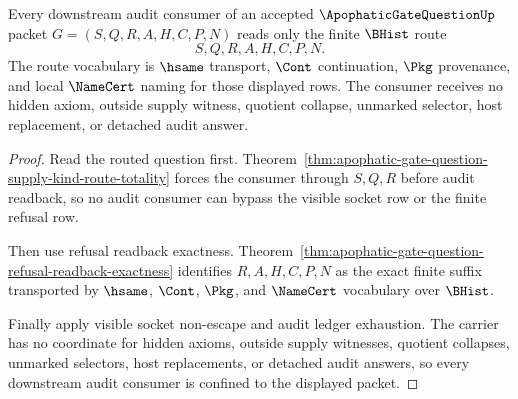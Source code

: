 \begin{theorem}
\label{thm:apophatic-gate-question-audit-consumer-nonescape}
Every downstream audit consumer of an accepted $\ApophaticGateQuestionUp$ packet $G=(S,Q,R,A,H,C,P,N)$ reads only the finite $\BHist$ route
$$
S,Q,R,A,H,C,P,N.
$$
The route vocabulary is $\hsame$ transport, $\Cont$ continuation, $\Pkg$ provenance, and local $\NameCert$ naming for those displayed rows. The consumer receives no hidden axiom, outside supply witness, quotient collapse, unmarked selector, host replacement, or detached audit answer.
\end{theorem}
\begin{proof}
Read the routed question first. Theorem~\ref{thm:apophatic-gate-question-supply-kind-route-totality} forces the consumer through $S,Q,R$ before audit readback, so no audit consumer can bypass the visible socket row or the finite refusal row.

Then use refusal readback exactness. Theorem~\ref{thm:apophatic-gate-question-refusal-readback-exactness} identifies $R,A,H,C,P,N$ as the exact finite suffix transported by $\hsame$, $\Cont$, $\Pkg$, and $\NameCert$ vocabulary over $\BHist$.

Finally apply visible socket non-escape and audit ledger exhaustion. The carrier has no coordinate for hidden axioms, outside supply witnesses, quotient collapses, unmarked selectors, host replacements, or detached audit answers, so every downstream audit consumer is confined to the displayed packet.
\end{proof}

